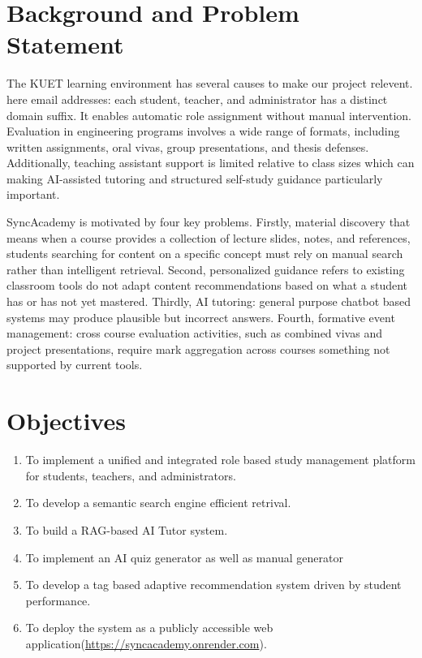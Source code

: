 \documentclass[12pt,a4paper]{report}
\begin{document}
\section{Background and Problem Statement}
The KUET learning environment has several causes to make our project relevent. here email addresses: each student, teacher, and administrator has a distinct domain suffix. It enables automatic role assignment without manual intervention. Evaluation in engineering programs involves a wide range of formats, including written assignments, oral vivas, group presentations, and thesis defenses. Additionally, teaching assistant support is limited relative to class sizes which can making AI-assisted tutoring and structured self-study guidance particularly important.

SyncAcademy is motivated by four key problems. Firstly, material discovery that means when a course provides a collection of lecture slides, notes, and references, students searching for content on a specific concept must rely on manual search rather than intelligent retrieval. Second, personalized guidance refers to existing classroom tools do not adapt content recommendations based on what a student has or has not yet mastered. Thirdly, AI tutoring: general purpose chatbot based systems may produce plausible but incorrect answers. Fourth, formative event management: cross course evaluation activities, such as combined vivas and project presentations, require mark aggregation across courses something not supported by current tools.

\section{Objectives}
\begin{enumerate}[leftmargin=0.5in]
  \item To implement a unified and integrated role based study management platform for students, teachers, and administrators.
  \item To develop a semantic search engine efficient retrival.
  \item To build a RAG-based AI Tutor system. 
  \item To implement an AI quiz generator as well as manual generator
  \item To develop a tag based adaptive recommendation system driven by student performance.
  \item To deploy the system as a publicly accessible web application(\url{https://syncacademy.onrender.com}).
\end{enumerate}
\end{document}
